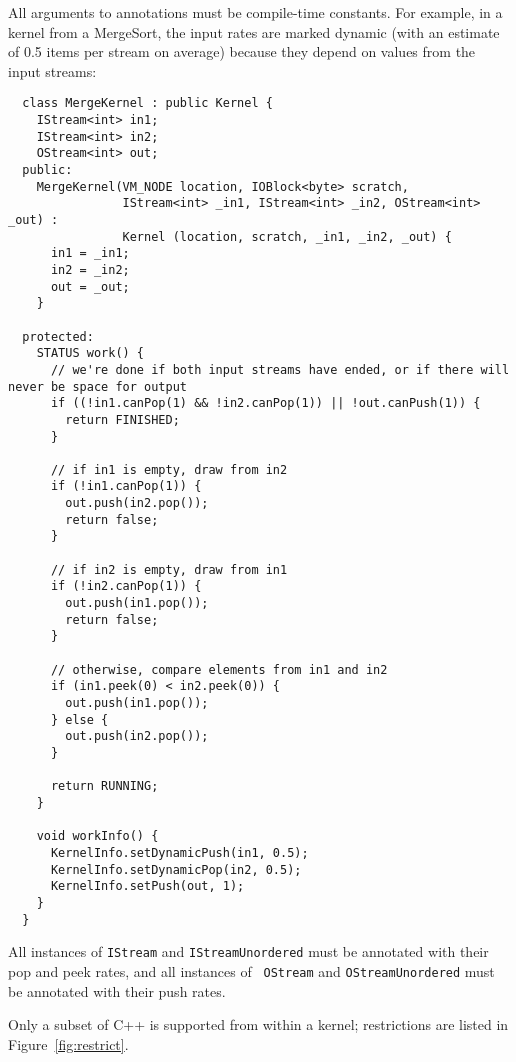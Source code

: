 All arguments to annotations must be compile-time constants.  For
example, in a kernel from a MergeSort, the input rates are marked
dynamic (with an estimate of 0.5 items per stream on average) because
they depend on values from the input streams:
{\small
\begin{verbatim}
  class MergeKernel : public Kernel {
    IStream<int> in1;
    IStream<int> in2;
    OStream<int> out;
  public:
    MergeKernel(VM_NODE location, IOBlock<byte> scratch,
                IStream<int> _in1, IStream<int> _in2, OStream<int> _out) :
                Kernel (location, scratch, _in1, _in2, _out) {
      in1 = _in1;
      in2 = _in2;
      out = _out;
    }

  protected:
    STATUS work() {
      // we're done if both input streams have ended, or if there will never be space for output
      if ((!in1.canPop(1) && !in2.canPop(1)) || !out.canPush(1)) {
        return FINISHED;
      }

      // if in1 is empty, draw from in2
      if (!in1.canPop(1)) {          
        out.push(in2.pop());
        return false;
      }

      // if in2 is empty, draw from in1
      if (!in2.canPop(1)) {
        out.push(in1.pop());
        return false;
      } 

      // otherwise, compare elements from in1 and in2
      if (in1.peek(0) < in2.peek(0)) {
        out.push(in1.pop());
      } else {
        out.push(in2.pop());
      }

      return RUNNING;
    }

    void workInfo() {
      KernelInfo.setDynamicPush(in1, 0.5);
      KernelInfo.setDynamicPop(in2, 0.5);
      KernelInfo.setPush(out, 1);
    }
  }  
\end{verbatim}}

All instances of {\tt IStream} and {\tt IStreamUnordered} must be
annotated with their pop and peek rates, and all instances of {\tt
OStream} and {\tt OStreamUnordered} must be annotated with their push
rates.


Only a subset of C++ is supported from within a kernel; restrictions
are listed in Figure~\ref{fig:restrict}.  

